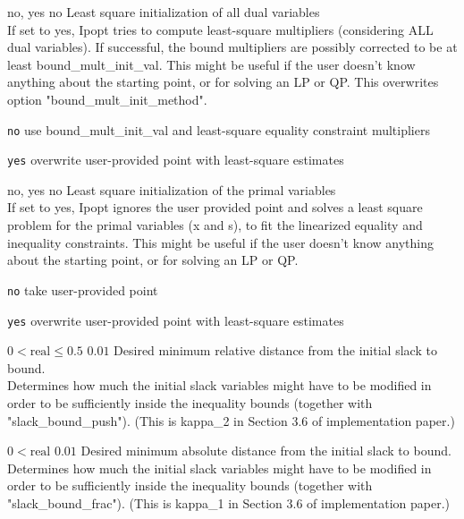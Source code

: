%
{\ttfamily no, yes}%
{no}%
{Least square initialization of all dual variables\\
If set to yes, Ipopt tries to compute least-square multipliers (considering ALL dual variables).  If successful, the bound multipliers are possibly corrected to be at least bound\_mult\_init\_val. This might be useful if the user doesn't know anything about the starting point, or for solving an LP or QP.  This overwrites option "bound\_mult\_init\_method".}%
{\begin{list}{}{
\setlength{\parsep}{0em}
\setlength{\leftmargin}{5ex}
\setlength{\labelwidth}{2ex}
\setlength{\itemindent}{0ex}
\setlength{\topsep}{0pt}}
\item[\texttt{no}] use bound\_mult\_init\_val and least-square equality constraint multipliers
\item[\texttt{yes}] overwrite user-provided point with least-square estimates
\end{list}
}

%
{\ttfamily no, yes}%
{no}%
{Least square initialization of the primal variables\\
If set to yes, Ipopt ignores the user provided point and solves a least square problem for the primal variables (x and s), to fit the linearized equality and inequality constraints.  This might be useful if the user doesn't know anything about the starting point, or for solving an LP or QP.}%
{\begin{list}{}{
\setlength{\parsep}{0em}
\setlength{\leftmargin}{5ex}
\setlength{\labelwidth}{2ex}
\setlength{\itemindent}{0ex}
\setlength{\topsep}{0pt}}
\item[\texttt{no}] take user-provided point
\item[\texttt{yes}] overwrite user-provided point with least-square estimates
\end{list}
}

%
{$0<\textrm{real}\leq0.5$}%
{$0.01$}%
{Desired minimum relative distance from the initial slack to bound.\\
Determines how much the initial slack variables might have to be modified in order to be sufficiently inside the inequality bounds (together with "slack\_bound\_push").  (This is kappa\_2 in Section 3.6 of implementation paper.)}%
{}

%
{$0<\textrm{real}$}%
{$0.01$}%
{Desired minimum absolute distance from the initial slack to bound.\\
Determines how much the initial slack variables might have to be modified in order to be sufficiently inside the inequality bounds (together with "slack\_bound\_frac").  (This is kappa\_1 in Section 3.6 of implementation paper.)}%
{}

